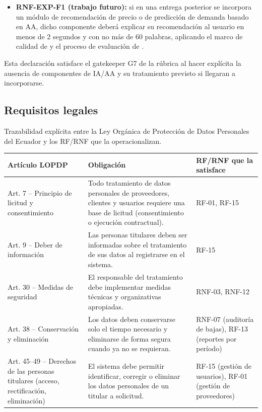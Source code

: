 \documentclass[11pt,a4paper]{article}
\begin{document}
\begin{itemize}[nosep]
\item \textbf{RNF-EXP-F1 (trabajo futuro):} si en una entrega posterior se incorpora un módulo de recomendación de precio o de predicción de demanda basado en AA, dicho componente deberá explicar su recomendación al usuario en menos de 2 segundos y con no más de 60 palabras, aplicando el marco de calidad de \cite{chazette2021exploring} y el proceso de evaluación de \cite{chazette2022explainable}.
\end{itemize}
Esta declaración satisface el gatekeeper G7 de la rúbrica al hacer explícita la ausencia de componentes de IA/AA y su tratamiento previsto si llegaran a incorporarse.

\subsection{Requisitos legales}
Trazabilidad explícita entre la Ley Orgánica de Protección de Datos Personales del Ecuador \cite{lopd2021} y los RF/RNF que la operacionalizan.

\begin{longtable}{|p{2.5cm}|p{6cm}|p{5cm}|}
\hline
\textbf{Artículo LOPDP} & \textbf{Obligación} & \textbf{RF/RNF que la satisface} \\
\hline
Art. 7 -- Principio de licitud y consentimiento & Todo tratamiento de datos personales de proveedores, clientes y usuarios requiere una base de licitud (consentimiento o ejecución contractual). & RF-01, RF-15 \\
\hline
Art. 9 -- Deber de información & Las personas titulares deben ser informadas sobre el tratamiento de sus datos al registrarse en el sistema. & RF-15 \\
\hline
Art. 30 -- Medidas de seguridad & El responsable del tratamiento debe implementar medidas técnicas y organizativas apropiadas. & RNF-03, RNF-12 \\
\hline
Art. 38 -- Conservación y eliminación & Los datos deben conservarse solo el tiempo necesario y eliminarse de forma segura cuando ya no se requieran. & RNF-07 (auditoría de bajas), RF-13 (reportes por período) \\
\hline
Art. 45--49 -- Derechos de las personas titulares (acceso, rectificación, eliminación) & El sistema debe permitir identificar, corregir o eliminar los datos personales de un titular a solicitud. & RF-15 (gestión de usuarios), RF-01 (gestión de proveedores) \\
\hline
\end{longtable}
\end{document}
